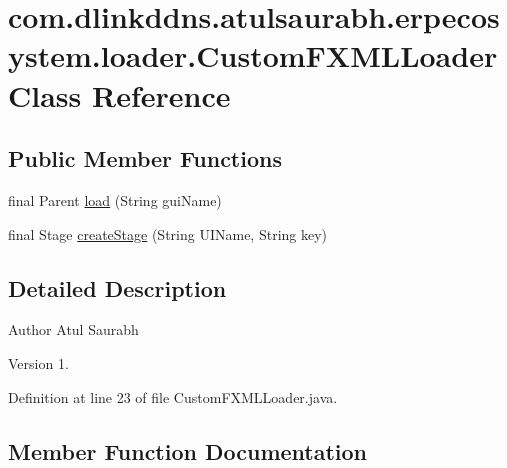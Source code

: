 \hypertarget{classcom_1_1dlinkddns_1_1atulsaurabh_1_1erpecosystem_1_1loader_1_1_custom_f_x_m_l_loader}{}\section{com.\+dlinkddns.\+atulsaurabh.\+erpecosystem.\+loader.\+Custom\+F\+X\+M\+L\+Loader Class Reference}
\label{classcom_1_1dlinkddns_1_1atulsaurabh_1_1erpecosystem_1_1loader_1_1_custom_f_x_m_l_loader}
\subsection*{Public Member Functions}
\begin{DoxyCompactItemize}
\item 
final Parent \mbox{\hyperlink{classcom_1_1dlinkddns_1_1atulsaurabh_1_1erpecosystem_1_1loader_1_1_custom_f_x_m_l_loader_a7e3c0b074c43866c2950964b208b2bef}{load}} (String gui\+Name)
\item 
final Stage \mbox{\hyperlink{classcom_1_1dlinkddns_1_1atulsaurabh_1_1erpecosystem_1_1loader_1_1_custom_f_x_m_l_loader_abd9fb19f6b3d55a6044e83db37b23fd4}{create\+Stage}} (String U\+I\+Name, String key)
\end{DoxyCompactItemize}


\subsection{Detailed Description}
\begin{DoxyAuthor}{Author}
Atul Saurabh 
\end{DoxyAuthor}
\begin{DoxyVersion}{Version}
1. 
\end{DoxyVersion}


Definition at line 23 of file Custom\+F\+X\+M\+L\+Loader.\+java.



\subsection{Member Function Documentation}
\mbox{\label{classcom_1_1dlinkddns_1_1atulsaurabh_1_1erpecosystem_1_1loader_1_1_custom_f_x_m_l_loader_abd9fb19f6b3d55a6044e83db37b23fd4}} 
